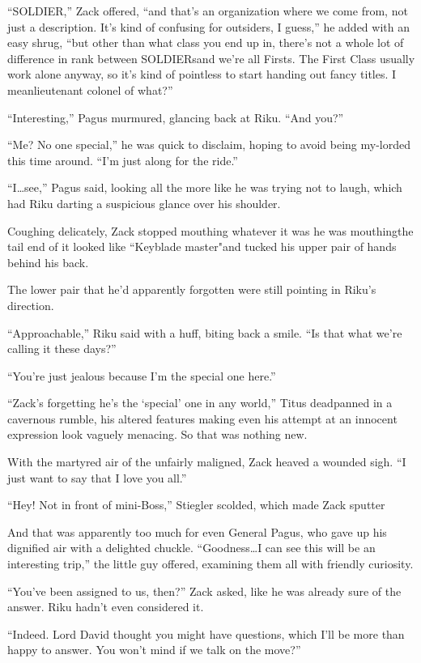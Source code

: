``SOLDIER,'' Zack offered, ``and that's an organization where we come from, not just a description. It's kind of confusing for outsiders, I guess,'' he added with an easy shrug, ``but other than what class you end up in, there's not a whole lot of difference in rank between SOLDIERs\textemdash and we're all Firsts. The First Class usually work alone anyway, so it's kind of pointless to start handing out fancy titles. I mean\textemdash lieutenant colonel of what?''

``Interesting,'' Pagus murmured, glancing back at Riku. ``And you?''

``Me? No one special,'' he was quick to disclaim, hoping to avoid being my-lorded this time around. ``I'm just along for the ride.''

``I\ldots see,'' Pagus said, looking all the more like he was trying not to laugh, which had Riku darting a suspicious glance over his shoulder.

Coughing delicately, Zack stopped mouthing whatever it was he was mouthing\textemdash the tail end of it looked like ``Keyblade master"\textemdash and tucked his upper pair of hands behind his back.

The lower pair that he'd apparently forgotten were still pointing in Riku's direction.

``Approachable,'' Riku said with a huff, biting back a smile. ``Is that what we're calling it these days?''

``You're just jealous because I'm the special one here.''

``Zack's forgetting he's the `special' one in any world,'' Titus deadpanned in a cavernous rumble, his altered features making even his attempt at an innocent expression look vaguely menacing. So that was nothing new.

With the martyred air of the unfairly maligned, Zack heaved a wounded sigh. ``I just want to say that I love you all.''

``Hey! Not in front of mini-Boss,'' Stiegler scolded, which made Zack sputter\textemdash 

And that was apparently too much for even General Pagus, who gave up his dignified air with a delighted chuckle. ``Goodness\ldots I can see this will be an interesting trip,'' the little guy offered, examining them all with friendly curiosity.

``You've been assigned to us, then?'' Zack asked, like he was already sure of the answer. Riku hadn't even considered it.

``Indeed. Lord David thought you might have questions, which I'll be more than happy to answer. You won't mind if we talk on the move?''

